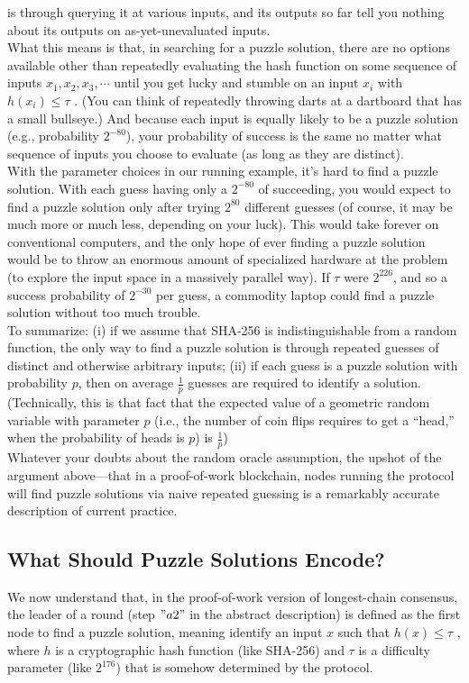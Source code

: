 is through querying it at various inputs, and its outputs so far tell you nothing
about its outputs on as-yet-unevaluated inputs.\\
What this means is that, in searching for a puzzle solution, there are no options available other than repeatedly evaluating the hash function on some sequence of inputs $x_1, x_2, x_3, \cdots$ until you get lucky and stumble on an input $x_i$ with $h(x_i) \leq \tau$ . (You can
think of repeatedly throwing darts at a dartboard that has a small bullseye.)
And because each input is equally likely to be a puzzle solution (e.g., probability $2^{-80}$), your
probability of success is the same no matter what sequence of inputs you choose to evaluate
(as long as they are distinct).\\
With the parameter choices in our running example, it’s hard to find a
puzzle solution. With each guess having only a $2^{-80}$ of succeeding, you would expect to find
a puzzle solution only after trying $2^{80}$ different guesses (of course, it may be much more or
much less, depending on your luck). This would take forever on conventional computers, and
the only hope of ever finding a puzzle solution would be to throw an enormous amount of
specialized hardware at the problem (to explore the input space in a massively parallel
way). If $\tau$ were $2^{226}$, and so a success probability of $2^{-30}$ per guess, a commodity laptop
could find a puzzle solution without too much trouble.\\
To summarize: (i) if we assume that SHA-256 is indistinguishable from a random function, the only way to find a puzzle solution is through repeated guesses of distinct and
otherwise arbitrary inputs; (ii) if each guess is a puzzle solution with probability $p$, then on
average $\frac{1}{p}$ guesses are required to identify a solution. (Technically, this is that fact that the expected value of a geometric random variable with parameter $p$
(i.e., the number of coin flips requires to get a “head,” when the probability of heads is $p$) is $\frac{1}{p}$)\\

Whatever your doubts about the random oracle assumption, the upshot of the argument
above—that in a proof-of-work blockchain, nodes running the protocol will find puzzle solutions via naive repeated guessing is a remarkably accurate description of current practice.
\subsection{What Should Puzzle Solutions Encode?}
We now understand that, in the proof-of-work version of longest-chain consensus, the leader
of a round (step $"a2"$ in the abstract description) is defined as the first node to find a puzzle
solution, meaning identify an input $x$ such that $h(x) \leq \tau$ , where $h$ is a cryptographic hash
function (like SHA-256) and $\tau$ is a difficulty parameter (like $2^{176}$) that is somehow determined
by the protocol.\\

